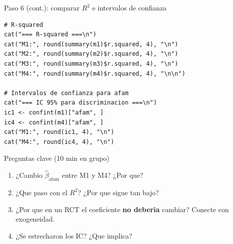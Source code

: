 \documentclass[aspectratio=169, 11pt]{beamer}
\begin{document}
\begin{frame}[fragile]{Paso 6 (cont.): comparar $R^2$ e intervalos de confianza}
\begin{lstlisting}[basicstyle=\ttfamily\scriptsize]
# R-squared
cat("=== R-squared ===\n")
cat("M1:", round(summary(m1)$r.squared, 4), "\n")
cat("M2:", round(summary(m2)$r.squared, 4), "\n")
cat("M3:", round(summary(m3)$r.squared, 4), "\n")
cat("M4:", round(summary(m4)$r.squared, 4), "\n\n")

# Intervalos de confianza para afam
cat("=== IC 95% para discriminacion ===\n")
ic1 <- confint(m1)["afam", ]
ic4 <- confint(m4)["afam", ]
cat("M1:", round(ic1, 4), "\n")
cat("M4:", round(ic4, 4), "\n")
\end{lstlisting}

\vspace{0.1cm}
\begin{block}{Preguntas clave (10 min en grupo)}
\footnotesize
\begin{enumerate}\setlength{\itemsep}{1pt}
  \item ¿Cambio $\hat{\beta}_{\text{afam}}$ entre M1 y M4? ¿Por que?
  \item ¿Que paso con el $R^2$? ¿Por que sigue tan bajo?
  \item ¿Por que en un RCT el coeficiente \textbf{no deberia} cambiar? Conecte con exogeneidad.
  \item ¿Se estrecharon los IC? ¿Que implica?
\end{enumerate}
\end{block}
\end{frame}
\end{document}
